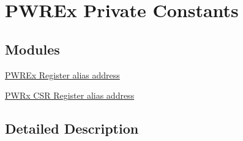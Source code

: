 \hypertarget{group___p_w_r_ex___private___constants}{}\section{P\+W\+R\+Ex Private Constants}
\label{group___p_w_r_ex___private___constants}
\subsection*{Modules}
\begin{DoxyCompactItemize}
\item 
\hyperlink{group___p_w_r_ex__register__alias__address}{P\+W\+R\+Ex Register alias address}
\item 
\hyperlink{group___p_w_r_ex___c_s_r__register__alias}{P\+W\+Rx C\+S\+R Register alias address}
\end{DoxyCompactItemize}


\subsection{Detailed Description}
